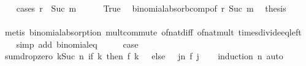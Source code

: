 \begin{isabellebody}
\ \ \isamarkupfalse%
\ {\isacharparenleft}{\kern0pt}cases\ {\isachardoublequoteopen}r\ {\isasymge}\ Suc\ m{\isachardoublequoteclose}{\isacharparenright}{\kern0pt}\isanewline
\ \ \ \ \isamarkupfalse%
\ True\ \isamarkupfalse%
\ binomial{\isacharunderscore}{\kern0pt}absorb{\isacharunderscore}{\kern0pt}comp{\isacharbrackleft}{\kern0pt}of\ r\ {\isachardoublequoteopen}Suc\ m{\isachardoublequoteclose}{\isacharbrackright}{\kern0pt}\ \isamarkupfalse%
\ {\isacharquery}{\kern0pt}thesis\isanewline
\ \ \ \ \ \ \isamarkupfalse%
\ {\isacharparenleft}{\kern0pt}metis\ binomial{\isacharunderscore}{\kern0pt}absorption\ mult{\isachardot}{\kern0pt}commute\ of{\isacharunderscore}{\kern0pt}nat{\isacharunderscore}{\kern0pt}diff\ of{\isacharunderscore}{\kern0pt}nat{\isacharunderscore}{\kern0pt}mult\ times{\isacharunderscore}{\kern0pt}divide{\isacharunderscore}{\kern0pt}eq{\isacharunderscore}{\kern0pt}left{\isacharparenright}{\kern0pt}\isanewline
\ \ \isamarkupfalse%
\ {\isacharparenleft}{\kern0pt}simp\ add{\isacharcolon}{\kern0pt}\ binomial{\isacharunderscore}{\kern0pt}eq{\isacharunderscore}{\kern0pt}{}{\isacharparenright}{\kern0pt}\isanewline
\ \ \isamarkupfalse%
\ \isamarkupfalse%
\ {\isacharquery}{\kern0pt}case\ \isakeywordONE{{\isachardot}{\kern0pt}}\isamarkupfalse%
\isanewline
{}\isamarkupfalse%
%
\endisatagproof
{\isafoldproof}%
%
\isadelimproof
\isanewline
%
\endisadelimproof
\isanewline
\isanewline
{}\isamarkupfalse%
\ sum{\isacharunderscore}{\kern0pt}drop{\isacharunderscore}{\kern0pt}zero{\isacharcolon}{\kern0pt}\ {\isachardoublequoteopen}{\isacharparenleft}{\kern0pt}{\isasymSum}k{\isasymle}Suc\ n{\isachardot}{\kern0pt}\ if\ {}{\isacharless}{\kern0pt}k\ then\ {\isacharparenleft}{\kern0pt}f\ {\isacharparenleft}{\kern0pt}k\ {\isacharminus}{\kern0pt}\ {}{\isacharparenright}{\kern0pt}{\isacharparenright}{\kern0pt}\ else\ {}{\isacharparenright}{\kern0pt}\ {\isacharequal}{\kern0pt}\ {\isacharparenleft}{\kern0pt}{\isasymSum}j{\isasymle}n{\isachardot}{\kern0pt}\ f\ j{\isacharparenright}{\kern0pt}{\isachardoublequoteclose}\isanewline
%
\isadelimproof
\ \ %
\endisadelimproof
%
\isatagproof
{}\isamarkupfalse%
\ {\isacharparenleft}{\kern0pt}induction\ n{\isacharparenright}{\kern0pt}\ auto%
\endisatagproof
{\isafoldproof}%
%
\isadelimproof
\isanewline
%
\endisadelimproof
\isanewline
{}\isamarkupfalse%

\end{isabellebody}
